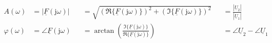 \begin{frame}
\begin{columns}[t]
{            \begin{align}
                \label{eq:def:A}
                A(\omega)       & = |\underline{F}(\mathrm{j}\omega)|&
                                & = \sqrt{\left(\Re\{\underline{F}(\mathrm{j}\omega)\}\right)^2 + \left(\Im\{\underline{F}(\mathrm{j}\omega)\}\right)^2}&
                                & = \frac{|\underline{U}_2|}{|\underline{U}_1|}\\
                \label{eq:def:phi}
                \varphi(\omega) & = \angle \underline{F}(\mathrm{j}\omega)&
                                & = \arctan\left(\frac{\Im\{\underline{F}(\mathrm{j}\omega)\}}{\Re\{\underline{F}(\mathrm{j}\omega)\}}\right)&
                                & = \angle \underline{U}_2 - \angle \underline{U}_1
            \end{align}
        }
\end{columns}
\end{frame}


